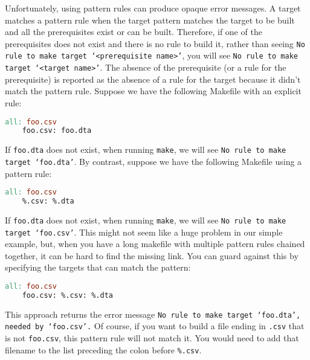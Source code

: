 Unfortunately, using pattern rules can produce opaque error messages.
A target matches a pattern rule when the target pattern matches the target to be built
and
all the prerequisites exist or can be built.
Therefore, if one of the prerequisites does not exist
	and there is no rule to build it,
	rather than seeing \texttt{No rule to make target `<prerequisite name>'},
	you will see \texttt{No rule to make target `<target name>'}.
The absence of the prerequisite (or a rule for the prerequisite) is reported
	as the absence of a rule for the target because it didn't match the pattern rule.
Suppose we have the following Makefile with an explicit rule:
\begin{lstlisting}[language=make]
	all: foo.csv
	foo.csv: foo.dta
\end{lstlisting}
If \texttt{foo.dta} does not exist, when running \texttt{make},
	we will see \texttt{No rule to make target `foo.dta'}.
By contrast, suppose we have the following Makefile using a pattern rule:
\begin{lstlisting}[language=make]
	all: foo.csv
	%.csv: %.dta
\end{lstlisting}
If \texttt{foo.dta} does not exist, when running \texttt{make},
	we will see \texttt{No rule to make target `foo.csv'}.
This might not seem like a huge problem in our simple example,
	but, when you have a long makefile with multiple pattern rules chained together,
	it can be hard to find the missing link.
You can guard against this by specifying the targets that can match the pattern:
\begin{lstlisting}[language=make]
	all: foo.csv
	foo.csv: %.csv: %.dta
\end{lstlisting}
This approach returns the error message \texttt{No rule to make target `foo.dta', needed by `foo.csv'.}
Of course, if you want to build a file ending in \texttt{.csv} that is not \texttt{foo.csv},
	this pattern rule will not match it.
You would need to add that filename to the list preceding the colon before \texttt{\%.csv}.

